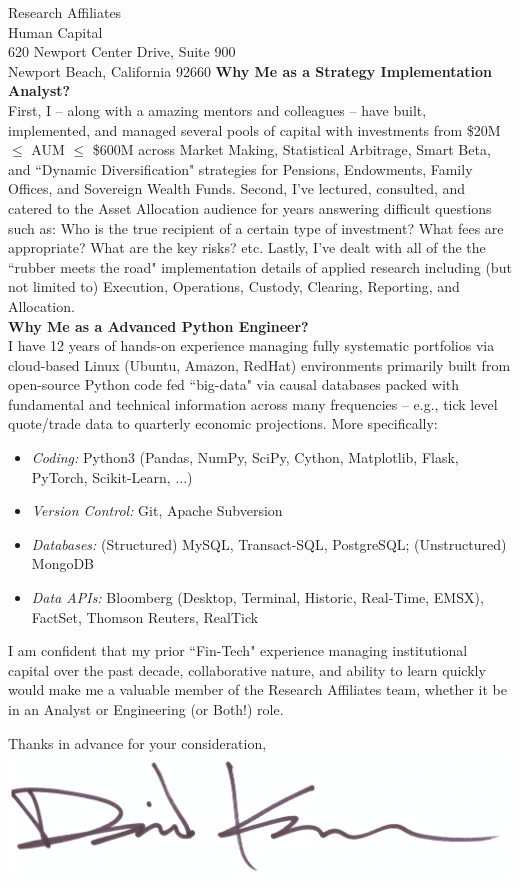 \documentclass{letter}
\begin{document}
\begin{letter}{
  Research Affiliates \\
  Human Capital \\
  620 Newport Center Drive, Suite 900 \\
  Newport Beach, California 92660
}
\textbf{Why Me as a Strategy Implementation Analyst?} \\
First, I -- along with a amazing mentors and colleagues -- have built, implemented,
and managed several pools of capital with investments from \$20M $\leq$ AUM $\leq$ \$600M
across Market Making, Statistical Arbitrage, Smart Beta, and ``Dynamic Diversification"
strategies for Pensions, Endowments, Family Offices, and Sovereign Wealth Funds.
Second, I've lectured, consulted, and catered to the Asset Allocation
audience for years answering difficult questions such as: Who is the true recipient of
a certain type of investment? What fees are appropriate? What are the key risks? etc.
Lastly, I've dealt with all of the the ``rubber meets the road" implementation details
of applied research including (but not limited to) Execution, Operations, Custody,
Clearing, Reporting, and Allocation. \\

\textbf{Why Me as a Advanced Python Engineer?} \\
I have 12 years of hands-on experience managing fully systematic portfolios
via cloud-based Linux (Ubuntu, Amazon, RedHat) environments primarily built
from open-source Python code fed ``big-data" via causal databases packed with
fundamental and technical information across many frequencies -- e.g., tick
level quote/trade data to quarterly economic projections. More specifically:
\newpage 
\begin{itemize}
  \item \textit{Coding:} Python3 (Pandas, NumPy, SciPy, Cython, Matplotlib, Flask, PyTorch, Scikit-Learn, ...)
  \item \textit{Version Control:} Git, Apache Subversion
  \item \textit{Databases:} (Structured) MySQL, Transact-SQL, PostgreSQL; (Unstructured) MongoDB 
  \item \textit{Data APIs:} Bloomberg (Desktop, Terminal, Historic, Real-Time, EMSX), FactSet, Thomson Reuters, RealTick
\end{itemize}

I am confident that my prior ``Fin-Tech" experience managing institutional capital
over the past decade, collaborative nature, and ability to learn quickly would make
me a valuable member of the Research Affiliates team, whether it be in an Analyst
or Engineering (or Both!) role. \\

\closing{
  Thanks in advance for your consideration, \\
  \vspace{.1in}
  \includegraphics[scale=0.33]{signature.png}
}

\end{letter}
\end{document}
